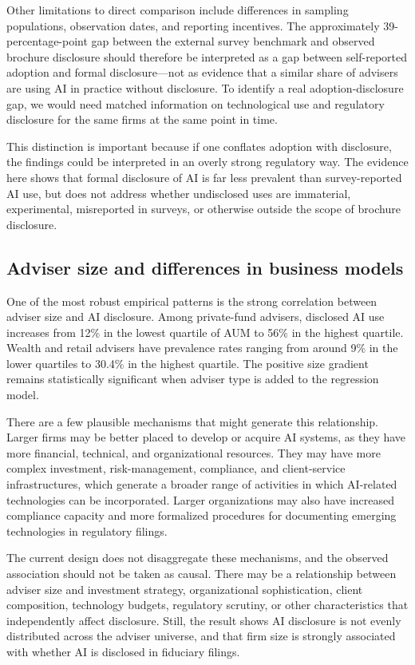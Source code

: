 \documentclass[utf8]{FrontiersinHarvard}
\begin{document}
Other limitations to direct comparison include differences in sampling populations, observation dates, and reporting incentives. The approximately 39-percentage-point gap between the external survey benchmark and observed brochure disclosure should therefore be interpreted as a gap between self-reported adoption and formal disclosure---not as evidence that a similar share of advisers are using AI in practice without disclosure. To identify a real adoption-disclosure gap, we would need matched information on technological use and regulatory disclosure for the same firms at the same point in time.

This distinction is important because if one conflates adoption with disclosure, the findings could be interpreted in an overly strong regulatory way. The evidence here shows that formal disclosure of AI is far less prevalent than survey-reported AI use, but does not address whether undisclosed uses are immaterial, experimental, misreported in surveys, or otherwise outside the scope of brochure disclosure.

\subsection{Adviser size and differences in business models}

One of the most robust empirical patterns is the strong correlation between adviser size and AI disclosure. Among private-fund advisers, disclosed AI use increases from 12\% in the lowest quartile of AUM to 56\% in the highest quartile. Wealth and retail advisers have prevalence rates ranging from around 9\% in the lower quartiles to 30.4\% in the highest quartile. The positive size gradient remains statistically significant when adviser type is added to the regression model.

There are a few plausible mechanisms that might generate this relationship. Larger firms may be better placed to develop or acquire AI systems, as they have more financial, technical, and organizational resources. They may have more complex investment, risk-management, compliance, and client-service infrastructures, which generate a broader range of activities in which AI-related technologies can be incorporated. Larger organizations may also have increased compliance capacity and more formalized procedures for documenting emerging technologies in regulatory filings.

The current design does not disaggregate these mechanisms, and the observed association should not be taken as causal. There may be a relationship between adviser size and investment strategy, organizational sophistication, client composition, technology budgets, regulatory scrutiny, or other characteristics that independently affect disclosure. Still, the result shows AI disclosure is not evenly distributed across the adviser universe, and that firm size is strongly associated with whether AI is disclosed in fiduciary filings.
\end{document}
